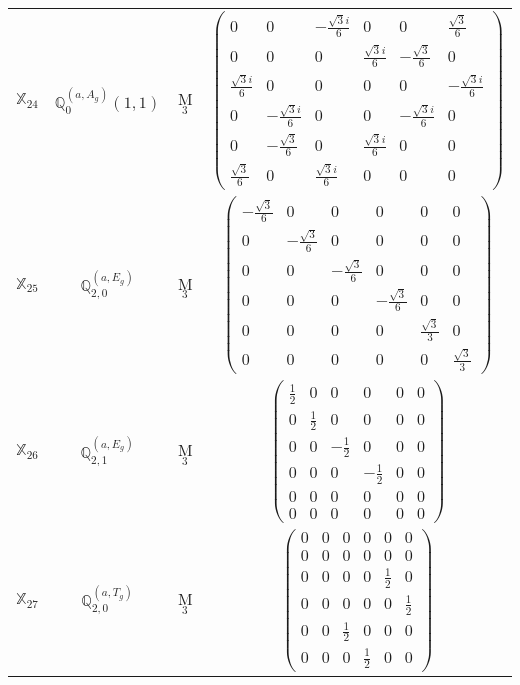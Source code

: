 \documentclass[fleqn,10pt,landscape]{article}
\begin{document}
\begin{itemize}
\begin{center}
\begin{longtable}{c|c|c|c}
$ \mathbb{X}_{24} $ & $\mathbb{Q}_{0}^{(a,A_{g})}(1,1)$ & M$_{3}$ & $\begin{pmatrix} 0 & 0 & - \frac{\sqrt{3} i}{6} & 0 & 0 & \frac{\sqrt{3}}{6} \\ 0 & 0 & 0 & \frac{\sqrt{3} i}{6} & - \frac{\sqrt{3}}{6} & 0 \\ \frac{\sqrt{3} i}{6} & 0 & 0 & 0 & 0 & - \frac{\sqrt{3} i}{6} \\ 0 & - \frac{\sqrt{3} i}{6} & 0 & 0 & - \frac{\sqrt{3} i}{6} & 0 \\ 0 & - \frac{\sqrt{3}}{6} & 0 & \frac{\sqrt{3} i}{6} & 0 & 0 \\ \frac{\sqrt{3}}{6} & 0 & \frac{\sqrt{3} i}{6} & 0 & 0 & 0 \end{pmatrix}$ \\
$ \mathbb{X}_{25} $ & $\mathbb{Q}_{2,0}^{(a,E_{g})}$ & M$_{3}$ & $\begin{pmatrix} - \frac{\sqrt{3}}{6} & 0 & 0 & 0 & 0 & 0 \\ 0 & - \frac{\sqrt{3}}{6} & 0 & 0 & 0 & 0 \\ 0 & 0 & - \frac{\sqrt{3}}{6} & 0 & 0 & 0 \\ 0 & 0 & 0 & - \frac{\sqrt{3}}{6} & 0 & 0 \\ 0 & 0 & 0 & 0 & \frac{\sqrt{3}}{3} & 0 \\ 0 & 0 & 0 & 0 & 0 & \frac{\sqrt{3}}{3} \end{pmatrix}$ \\
$ \mathbb{X}_{26} $ & $\mathbb{Q}_{2,1}^{(a,E_{g})}$ & M$_{3}$ & $\begin{pmatrix} \frac{1}{2} & 0 & 0 & 0 & 0 & 0 \\ 0 & \frac{1}{2} & 0 & 0 & 0 & 0 \\ 0 & 0 & - \frac{1}{2} & 0 & 0 & 0 \\ 0 & 0 & 0 & - \frac{1}{2} & 0 & 0 \\ 0 & 0 & 0 & 0 & 0 & 0 \\ 0 & 0 & 0 & 0 & 0 & 0 \end{pmatrix}$ \\
$ \mathbb{X}_{27} $ & $\mathbb{Q}_{2,0}^{(a,T_{g})}$ & M$_{3}$ & $\begin{pmatrix} 0 & 0 & 0 & 0 & 0 & 0 \\ 0 & 0 & 0 & 0 & 0 & 0 \\ 0 & 0 & 0 & 0 & \frac{1}{2} & 0 \\ 0 & 0 & 0 & 0 & 0 & \frac{1}{2} \\ 0 & 0 & \frac{1}{2} & 0 & 0 & 0 \\ 0 & 0 & 0 & \frac{1}{2} & 0 & 0 \end{pmatrix}$ \\

\end{longtable}
\end{center}
\end{itemize}
\end{document}
